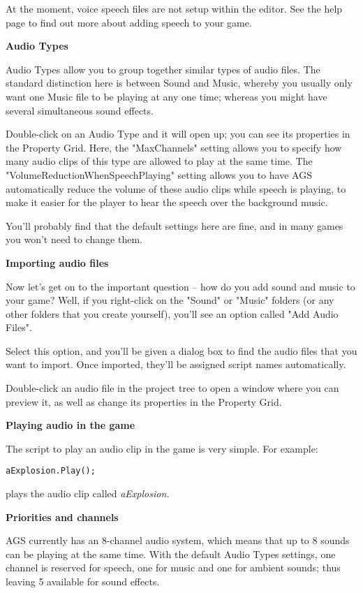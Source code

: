 At the moment, voice speech files are not setup within the editor. See the 
help page to find out more about adding speech to your game.

\bf{Audio Types}

Audio Types allow you to group together similar types of audio files. The standard
distinction here is between Sound and Music, whereby you usually only want one Music
file to be playing at any one time; whereas you might have several simultaneous sound
effects.

Double-click on an Audio Type and it will open up; you can see its properties in the
Property Grid. Here, the "MaxChannels" setting allows you to specify how many audio
clips of this type are allowed to play at the same time. The "VolumeReductionWhenSpeechPlaying"
setting allows you to have AGS automatically reduce the volume of these audio clips while
speech is playing, to make it easier for the player to hear the speech over the background
music.

You'll probably find that the default settings here are fine, and in many games you won't
need to change them.

\bf{Importing audio files}

Now let's get on to the important question -- how do you add sound and music to your game?
Well, if you right-click on the "Sound" or "Music" folders (or any other folders that
you create yourself), you'll see an option called "Add Audio Files".

Select this option, and you'll be given a dialog box to find the audio files that you
want to import. Once imported, they'll be assigned script names automatically.

Double-click an audio file in the project tree to open a window where you can preview
it, as well as change its properties in the Property Grid.

\bf{Playing audio in the game}

The script to play an audio clip in the game is very simple. For example:
\begin{verbatim}
aExplosion.Play();
\end{verbatim}
plays the audio clip called \it{aExplosion}.

\bf{Priorities and channels}

AGS currently has an 8-channel audio system, which means that up to 8 sounds can be
playing at the same time. With the default Audio Types settings, one channel is reserved
for speech, one for music and one for ambient sounds; thus leaving 5 available for
sound effects.


